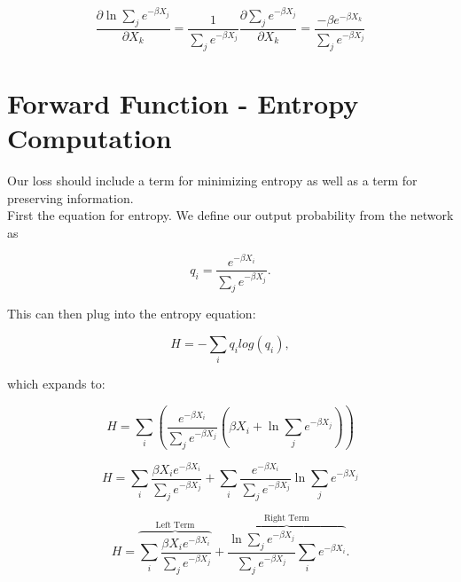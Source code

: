 \begin{equation}
    \frac{\partial \ln{\sum_{j} e^{-\beta X_{j}}}}{\partial X_{k}} = \frac{1}{\sum_{j} e^{-\beta X_{j}}} \frac{\partial \sum_{j} e^{-\beta X_{j}}}{\partial X_{k}} = \frac{-\beta e^{-\beta X_{k}}}{\sum_{j}e^{-\beta X_{j}}}
\label{dlne}
\end{equation}

\section{Forward Function - Entropy Computation} \label{forward}
\noindent Our loss should include a term for minimizing entropy as well as a term for preserving information.\\

\noindent First the equation for entropy. We define our output probability from the network as

\begin{equation}
    q_i = \frac{e^{-\beta X_{i}}}{\sum_{j} e^{-\beta X_{j}}}.
\label{qdef}
\end{equation}

\noindent This can then plug into the entropy equation:

\begin{equation}
    H = -\sum_{i} q_{i} log(q_{i}),
\label{entropy}
\end{equation}

\noindent which expands to:

\begin{displaymath}
    H = \sum_{i}\left( \frac{e^{-\beta X_{i}}}{\sum_{j} e^{-\beta X_{j}}} \left(\beta X_{i} + \ln{\sum_{j}e^{-\beta X_{j}}}\right)\right)
\label{entropyexp}
\end{displaymath}

\begin{displaymath}
    H =
    \sum_{i}\frac{\beta X_{i} e^{-\beta X_{i}}}{\sum_{j}e^{-\beta X_{j}}} + 
    \sum_{i}\frac{e^{-\beta X_{i}}}{\sum_{j}e^{-\beta X_{j}}}\ln{\sum_{j}e^{-\beta X_{j}}}
\label{entropyexp2}
\end{displaymath}

\begin{equation}
    H =
    \overbrace{\sum_{i}\frac{\beta X_{i}e^{-\beta X_{i}}}{\sum_{j}e^{-\beta X_{j}}}}^\text{Left Term} + 
    \overbrace{\frac{\ln{\sum_{j}e^{-\beta X_{j}}}}{\sum_{j}e^{-\beta X_{j}}}\sum_{i}e^{-\beta X_{i}}}^\text{Right Term}.
\label{entropyexp3}
\end{equation}

